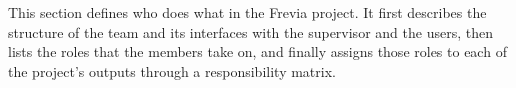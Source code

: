 This section defines who does what in the Frevia project. It first describes the structure of the team and its interfaces with the supervisor and the users, then lists the roles that the members take on, and finally assigns those roles to each of the project's outputs through a responsibility matrix.
